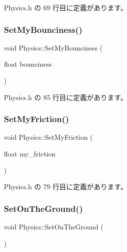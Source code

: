 Physics.\+h の 69 行目に定義があります。

\mbox{\label{class_physics_a662185709961c64615c51ac5f32ab2ff}} 
\subsubsection{\texorpdfstring{Set\+My\+Bounciness()}{SetMyBounciness()}}
{\footnotesize\ttfamily void Physics\+::\+Set\+My\+Bounciness (\begin{DoxyParamCaption}\item[{float}]{bounciness }\end{DoxyParamCaption})\hspace{0.3cm}{\ttfamily [inline]}}



 Physics.\+h の 85 行目に定義があります。

\mbox{\label{class_physics_a0e3c9825aa4129a2212c1c61d0cd6ecb}} 
\subsubsection{\texorpdfstring{Set\+My\+Friction()}{SetMyFriction()}}
{\footnotesize\ttfamily void Physics\+::\+Set\+My\+Friction (\begin{DoxyParamCaption}\item[{float}]{my\+\_\+friction }\end{DoxyParamCaption})\hspace{0.3cm}{\ttfamily [inline]}}



 Physics.\+h の 79 行目に定義があります。

\mbox{\label{class_physics_a4e132f82ecc7f24200ec72213e2dc0c6}} 
\subsubsection{\texorpdfstring{Set\+On\+The\+Ground()}{SetOnTheGround()}}
{\footnotesize\ttfamily void Physics\+::\+Set\+On\+The\+Ground (\begin{DoxyParamCaption}{ }\end{DoxyParamCaption})\hspace{0.3cm}{\ttfamily [inline]}}



